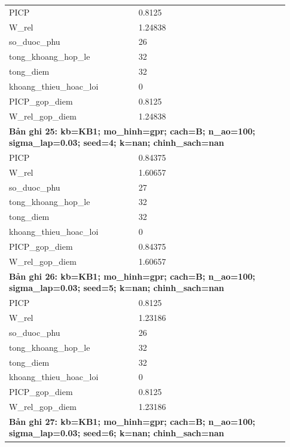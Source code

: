 \begin{longtable}{p{0.43\linewidth}p{0.50\linewidth}}
PICP & 0.8125 \\
W\_\allowbreak rel & 1.24838 \\
so\_\allowbreak duoc\_\allowbreak phu & 26 \\
tong\_\allowbreak khoang\_\allowbreak hop\_\allowbreak le & 32 \\
tong\_\allowbreak diem & 32 \\
khoang\_\allowbreak thieu\_\allowbreak hoac\_\allowbreak loi & 0 \\
PICP\_\allowbreak gop\_\allowbreak diem & 0.8125 \\
W\_\allowbreak rel\_\allowbreak gop\_\allowbreak diem & 1.24838 \\
\midrule
\multicolumn{2}{p{0.95\linewidth}}{\textbf{Bản ghi 25: kb=KB1; mo\_hinh=gpr; cach=B; n\_ao=100; sigma\_lap=0.03; seed=4; k=nan; chinh\_sach=nan}} \\
PICP & 0.84375 \\
W\_\allowbreak rel & 1.60657 \\
so\_\allowbreak duoc\_\allowbreak phu & 27 \\
tong\_\allowbreak khoang\_\allowbreak hop\_\allowbreak le & 32 \\
tong\_\allowbreak diem & 32 \\
khoang\_\allowbreak thieu\_\allowbreak hoac\_\allowbreak loi & 0 \\
PICP\_\allowbreak gop\_\allowbreak diem & 0.84375 \\
W\_\allowbreak rel\_\allowbreak gop\_\allowbreak diem & 1.60657 \\
\midrule
\multicolumn{2}{p{0.95\linewidth}}{\textbf{Bản ghi 26: kb=KB1; mo\_hinh=gpr; cach=B; n\_ao=100; sigma\_lap=0.03; seed=5; k=nan; chinh\_sach=nan}} \\
PICP & 0.8125 \\
W\_\allowbreak rel & 1.23186 \\
so\_\allowbreak duoc\_\allowbreak phu & 26 \\
tong\_\allowbreak khoang\_\allowbreak hop\_\allowbreak le & 32 \\
tong\_\allowbreak diem & 32 \\
khoang\_\allowbreak thieu\_\allowbreak hoac\_\allowbreak loi & 0 \\
PICP\_\allowbreak gop\_\allowbreak diem & 0.8125 \\
W\_\allowbreak rel\_\allowbreak gop\_\allowbreak diem & 1.23186 \\
\midrule
\multicolumn{2}{p{0.95\linewidth}}{\textbf{Bản ghi 27: kb=KB1; mo\_hinh=gpr; cach=B; n\_ao=100; sigma\_lap=0.03; seed=6; k=nan; chinh\_sach=nan}} \\

\end{longtable}
